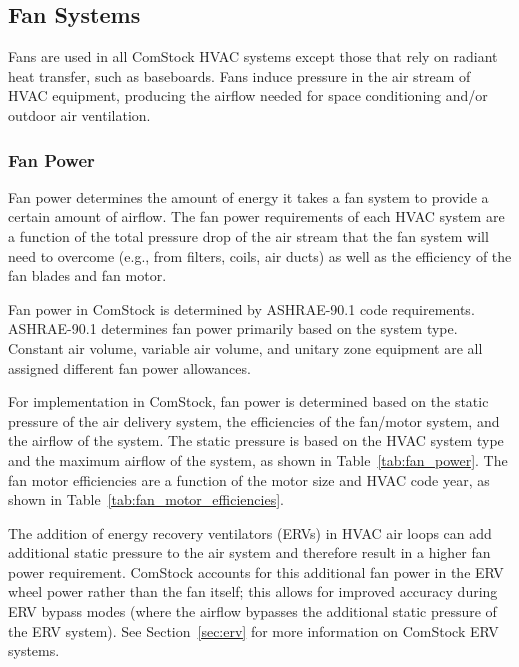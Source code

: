 \pagebreak
\subsection{Fan Systems}

Fans are used in all ComStock HVAC systems except those that rely on radiant heat transfer, such as baseboards. Fans induce pressure in the air stream of HVAC equipment, producing the airflow needed for space conditioning and/or outdoor air ventilation.

\subsubsection{Fan Power}

Fan power determines the amount of energy it takes a fan system to provide a certain amount of airflow. The fan power requirements of each HVAC system are a function of the total pressure drop of the air stream that the fan system will need to overcome (e.g., from filters, coils, air ducts) as well as the efficiency of the fan blades and fan motor.

Fan power in ComStock is determined by ASHRAE-90.1 code requirements. ASHRAE-90.1 determines fan power primarily based on the system type. Constant air volume, variable air volume, and unitary zone equipment are all assigned different fan power allowances.

For implementation in ComStock, fan power is determined based on the static pressure of the air delivery system, the efficiencies of the fan/motor system, and the airflow of the system. The static pressure is based on the HVAC system type and the maximum airflow of the system, as shown in Table~\ref{tab:fan_power}. The fan motor efficiencies are a function of the motor size and HVAC code year, as shown in Table~\ref{tab:fan_motor_efficiencies}.

The addition of energy recovery ventilators (ERVs) in HVAC air loops can add additional static pressure to the air system and therefore result in a higher fan power requirement. ComStock accounts for this additional fan power in the ERV wheel power rather than the fan itself; this allows for improved accuracy during ERV bypass modes (where the airflow bypasses the additional static pressure of the ERV system). See Section~\ref{sec:erv} for more information on ComStock ERV systems. 




